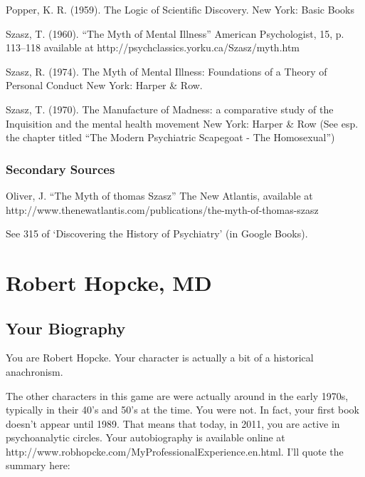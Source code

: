 Popper, K. R. (1959). The Logic of Scientific Discovery. New York: Basic Books

Szasz, T. (1960). ``The Myth of Mental Illness'' American Psychologist, 15, p. 113--118 available at http:\slash \slash psychclassics.yorku.ca\slash Szasz\slash myth.htm

Szasz, R. (1974). The Myth of Mental Illness: Foundations of a Theory of Personal Conduct New York: Harper \& Row.

Szasz, T. (1970). The Manufacture of Madness: a comparative study of the Inquisition and the mental health movement New York: Harper \& Row (See esp. the chapter titled ``The Modern Psychiatric Scapegoat - The Homosexual'')

\subsection{Secondary Sources}
\label{secondarysources}

Oliver, J. ``The Myth of thomas Szasz'' The New Atlantis, available at http:\slash \slash www.thenewatlantis.com\slash publications\slash the-myth-of-thomas-szasz

See 315 of `Discovering the History of Psychiatry' (in Google Books).

\chapter{Robert Hopcke, MD}
\label{roberthopckemd}

\section{Your Biography}
\label{yourbiography}

You are Robert Hopcke. Your character is actually a bit of a historical anachronism. 

The other characters in this game are were actually around in the early 1970s, typically in their 40's and 50's at the time. You were not. In fact, your first book doesn't appear until 1989. That means that today, in 2011, you are active in psychoanalytic circles. Your autobiography is available online at http:\slash \slash www.robhopcke.com\slash MyProfessionalExperience.en.html. I'll quote the summary here:

